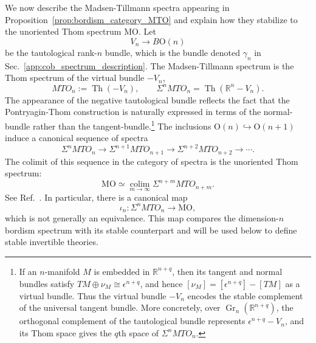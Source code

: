 \documentclass[aps,prx,reprint,superscriptaddress,twocolumn,amsmath,amssymb,amsfonts, nofootinbib]{revtex4-2}
\theoremstyle{apsstyle}
\begin{document}
We now describe the Madsen-Tillmann spectra appearing in Proposition~\ref{prop:bordism_category_MTO} and explain how they stabilize to the unoriented Thom spectrum $\mathrm{MO}$. Let
\begin{equation*}
    V_n\longrightarrow B\mathrm O(n)
\end{equation*}
be the tautological rank-$n$ bundle, which is the bundle denoted $\gamma_n$ in Sec.~\ref{app:cob_spectrum_description}. The Madsen-Tillmann spectrum is the Thom spectrum of the virtual bundle $-V_n$, 
\begin{equation} MTO_n := \operatorname{Th}(-V_n), \qquad \Sigma^nMTO_n = \operatorname{Th}(\mathbb R^n-V_n). \label{eq:MTO_definition} \end{equation} 
The appearance of the negative tautological bundle reflects the fact that the Pontryagin-Thom construction is naturally expressed in terms of the normal-bundle rather than the tangent-bundle.\footnote{If an $n$-manifold $M$ is embedded in $\mathbb R^{n+q}$, then its tangent and normal bundles satisfy $TM\oplus\nu_M\cong\epsilon^{n+q}$, and hence $[\nu_M]=[\epsilon^{n+q}]-[TM]$ as a virtual bundle. Thus the virtual bundle $-V_n$ encodes the stable complement of the universal tangent bundle. More concretely, over $\operatorname{Gr}_n(\mathbb R^{n+q})$, the orthogonal complement of the tautological bundle represents $\epsilon^{n+q}-V_n$, and its Thom space gives the $q$th space of $\Sigma^nMTO_n$.} The inclusions $\mathrm O(n)\hookrightarrow\mathrm O(n+1)$ induce a canonical sequence of spectra 
\begin{equation} 
\Sigma^nMTO_n \longrightarrow \Sigma^{n+1}MTO_{n+1} \longrightarrow \Sigma^{n+2}MTO_{n+2} \longrightarrow\cdots . 
\label{eq:MTO_filtration} 
\end{equation}   
The colimit of this sequence in the category of spectra is the unoriented Thom spectrum: \begin{equation} \mathrm{MO} \simeq \operatorname*{colim}_{m\to\infty} \Sigma^{n+m}MTO_{n+m}. \label{eq:MTO_colimit_MO} \end{equation} See Ref.~\cite[Sec.~7.1]{FreedHopkins}. In particular, there is a canonical map
\begin{equation}
    \iota_n: \Sigma^nMTO_n
    \longrightarrow \mathrm{MO},
    \label{eq:MTO_to_MO}
\end{equation}
which is not generally an equivalence. This map compares the dimension-$n$ bordism spectrum with its stable counterpart and will be used below to define stable invertible theories.
\end{document}
